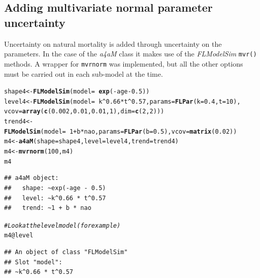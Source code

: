 \documentclass[a4paper,english,10pt]{article}\usepackage[]{graphicx}\usepackage[]{color}
\makeatletter
\newcommand{\hlnum}[1]{\textcolor[rgb]{0.686,0.059,0.569}{#1}}%
\newcommand{\hlcom}[1]{\textcolor[rgb]{0.678,0.584,0.686}{\textit{#1}}}%
\newcommand{\hlopt}[1]{\textcolor[rgb]{0,0,0}{#1}}%
\newcommand{\hlstd}[1]{\textcolor[rgb]{0.345,0.345,0.345}{#1}}%
\newcommand{\hlkwb}[1]{\textcolor[rgb]{0.69,0.353,0.396}{#1}}%
\newcommand{\hlkwc}[1]{\textcolor[rgb]{0.333,0.667,0.333}{#1}}%
\newcommand{\hlkwd}[1]{\textcolor[rgb]{0.737,0.353,0.396}{\textbf{#1}}}%
\newenvironment{kframe}{%
 \def\at@end@of@kframe{}%
 \ifinner\ifhmode%
  \def\at@end@of@kframe{\end{minipage}}%
  \begin{minipage}{\columnwidth}%
 \fi\fi%
 \def\FrameCommand##1{\hskip\@totalleftmargin \hskip-\fboxsep
 \colorbox{shadecolor}{##1}\hskip-\fboxsep
     \hskip-\linewidth \hskip-\@totalleftmargin \hskip\columnwidth}%
 \MakeFramed {\advance\hsize-\width
   \@totalleftmargin\z@ \linewidth\hsize
   \@setminipage}}%
 {\par\unskip\endMakeFramed%
 \at@end@of@kframe}
\newenvironment{knitrout}{}{} %
\newcommand{\code}[1]{{\texttt{#1}}}
\newcommand{\class}[1]{{\textit{#1}}}
\makeatother
\begin{document}
\subsection{Adding multivariate normal parameter uncertainty}

Uncertainty on natural mortality is added through uncertainty on the parameters. In the case of the \class{a4aM} class it makes use of the \class{FLModelSim} \code{mvr()} methods. A wrapper for \code{mvrnorm} was implemented, but all the other options must be carried out in each sub-model at the time.

\begin{knitrout}
\color{fgcolor}\begin{kframe}
\begin{alltt}
\hlstd{shape4} \hlkwb{<-} \hlkwd{FLModelSim}\hlstd{(}\hlkwc{model} \hlstd{=} \hlopt{~}\hlkwd{exp}\hlstd{(}\hlopt{-}\hlstd{age} \hlopt{-} \hlnum{0.5}\hlstd{))}
\hlstd{level4} \hlkwb{<-} \hlkwd{FLModelSim}\hlstd{(}\hlkwc{model} \hlstd{=} \hlopt{~}\hlstd{k}\hlopt{^}\hlnum{0.66} \hlopt{*} \hlstd{t}\hlopt{^}\hlnum{0.57}\hlstd{,} \hlkwc{params} \hlstd{=} \hlkwd{FLPar}\hlstd{(}\hlkwc{k} \hlstd{=} \hlnum{0.4}\hlstd{,} \hlkwc{t} \hlstd{=} \hlnum{10}\hlstd{),}
    \hlkwc{vcov} \hlstd{=} \hlkwd{array}\hlstd{(}\hlkwd{c}\hlstd{(}\hlnum{0.002}\hlstd{,} \hlnum{0.01}\hlstd{,} \hlnum{0.01}\hlstd{,} \hlnum{1}\hlstd{),} \hlkwc{dim} \hlstd{=} \hlkwd{c}\hlstd{(}\hlnum{2}\hlstd{,} \hlnum{2}\hlstd{)))}
\hlstd{trend4} \hlkwb{<-} \hlkwd{FLModelSim}\hlstd{(}\hlkwc{model} \hlstd{=} \hlopt{~}\hlnum{1} \hlopt{+} \hlstd{b} \hlopt{*} \hlstd{nao,} \hlkwc{params} \hlstd{=} \hlkwd{FLPar}\hlstd{(}\hlkwc{b} \hlstd{=} \hlnum{0.5}\hlstd{),} \hlkwc{vcov} \hlstd{=} \hlkwd{matrix}\hlstd{(}\hlnum{0.02}\hlstd{))}
\hlstd{m4} \hlkwb{<-} \hlkwd{a4aM}\hlstd{(}\hlkwc{shape} \hlstd{= shape4,} \hlkwc{level} \hlstd{= level4,} \hlkwc{trend} \hlstd{= trend4)}
\hlstd{m4} \hlkwb{<-} \hlkwd{mvrnorm}\hlstd{(}\hlnum{100}\hlstd{, m4)}
\hlstd{m4}
\end{alltt}
\begin{verbatim}
## a4aM object:
##   shape: ~exp(-age - 0.5)
##   level: ~k^0.66 * t^0.57
##   trend: ~1 + b * nao
\end{verbatim}
\begin{alltt}
\hlcom{# Look at the level model (for example)}
\hlstd{m4}\hlopt{@}\hlkwc{level}
\end{alltt}
\begin{verbatim}
## An object of class "FLModelSim"
## Slot "model":
## ~k^0.66 * t^0.57

\end{verbatim}
\end{kframe}
\end{knitrout}
\end{document}

